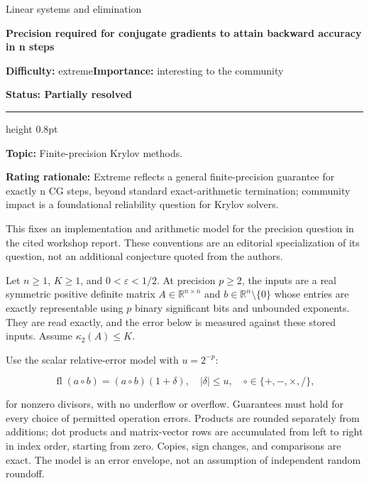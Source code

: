 \documentclass[11pt,a4paper]{article}
\begin{document}
{\sffamily\small\color{muted}Linear systems and elimination\par}
\vspace{3pt}
{\raggedright{}\sffamily\bfseries\fontsize{21}{24}\selectfont\color{ink}Precision
required for conjugate gradients to attain backward accuracy in n
steps\par}
\vspace{7pt}
{\sffamily\small\textbf{Difficulty:} extreme\quad\textbf{Importance:} interesting
to the community\par}
{\sffamily\small\bfseries\color{accent}Status: Partially resolved\par}
\vspace{4pt}
{\color{accent}\hrule height 0.8pt}
\vspace{6pt}
\textbf{Topic:} Finite-precision Krylov methods.

\textbf{Rating rationale:} Extreme reflects a general finite-precision
guarantee for exactly n CG steps, beyond standard exact-arithmetic
termination; community impact is a foundational reliability question for
Krylov solvers.

This fixes an implementation and arithmetic model for the precision
question in the cited workshop report. These conventions are an
editorial specialization of its question, not an additional conjecture
quoted from the authors.

Let \(n\ge1\), \(K\ge1\), and \(0<\varepsilon<1/2\). At precision
\(p\ge2\), the inputs are a real symmetric positive definite matrix
\(A\in\mathbb R^{n\times n}\) and \(b\in\mathbb R^n\setminus\{0\}\)
whose entries are exactly representable using \(p\) binary significant
bits and unbounded exponents. They are read exactly, and the error below
is measured against these stored inputs. Assume \(\kappa_2(A)\le K\).

Use the scalar relative-error model with \(u=2^{-p}\):

\[\mathop{\mathrm{fl}}\nolimits(a\circ b)=(a\circ b)(1+\delta),
\quad |\delta|\le u,\quad \circ\in\{+,-,\times,/\},\]

for nonzero divisors, with no underflow or overflow. Guarantees must
hold for every choice of permitted operation errors. Products are
rounded separately from additions; dot products and matrix-vector rows
are accumulated from left to right in index order, starting from zero.
Copies, sign changes, and comparisons are exact. The model is an error
envelope, not an assumption of independent random roundoff.
\end{document}
